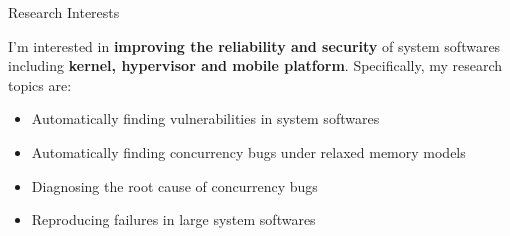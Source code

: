 \begin{rSection}{Research Interests}
\newcommand{\eg}{\textit{e}.\textit{g}.\xspace}

I'm interested in \textbf{improving the reliability and security} of
system softwares including \textbf{kernel, hypervisor and mobile
  platform}. Specifically, my research topics are:

\begin{itemize}[leftmargin=*,itemsep=-5pt]
\item{Automatically finding vulnerabilities in system softwares}
\item{Automatically finding concurrency bugs under relaxed memory models}
\item{Diagnosing the root cause of concurrency bugs}
\item{Reproducing failures in large system softwares}
\end{itemize}

\end{rSection}
